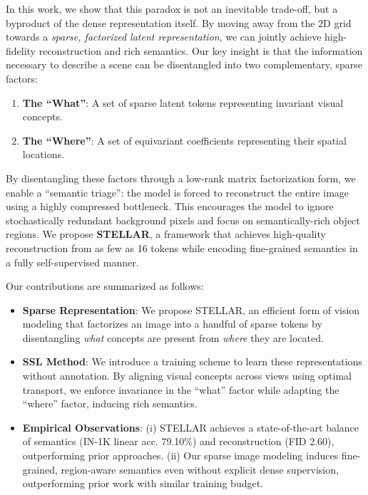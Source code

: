 In this work, we show that this paradox is not an inevitable trade-off, but a byproduct of the dense representation itself. By moving away from the 2D grid towards a \textit{sparse, factorized latent representation}, we can jointly achieve high-fidelity reconstruction and rich semantics. Our key insight is that the information necessary to describe a scene can be disentangled into two complementary, sparse factors:
\begin{enumerate}
    \item \textbf{The ``What''}: A set of sparse latent tokens representing invariant visual concepts.
    \item \textbf{The ``Where''}: A set of equivariant coefficients representing their spatial locations.
\end{enumerate}



By disentangling these factors through a low-rank matrix factorization form, we enable a ``semantic triage'': the model is forced to reconstruct the entire image using a highly compressed bottleneck. This encourages the model to ignore stochastically redundant background pixels and focus on semantically-rich object regions. We propose \textbf{STELLAR}, a framework that achieves high-quality reconstruction from as few as 16 tokens while encoding fine-grained semantics in a fully self-supervised manner.

Our contributions are summarized as follows:
\begin{itemize}
    \item \textbf{Sparse Representation}: We propose STELLAR, an efficient form of vision modeling that factorizes an image into a handful of sparse tokens by disentangling \textit{what} concepts are present from \textit{where} they are located.
    \item \textbf{SSL Method}: We introduce a training scheme to learn these representations without annotation. By aligning visual concepts across views using optimal transport, we enforce invariance in the ``what'' factor while adapting the ``where'' factor, inducing rich semantics.
    \item \textbf{Empirical Observations}: (i) STELLAR achieves a state-of-the-art balance of semantics (IN-1K linear acc. 79.10\%) and reconstruction (FID 2.60), outperforming prior approaches. (ii) Our sparse image modeling induces fine-grained, region-aware semantics even without explicit dense supervision, outperforming prior work with similar training budget.
\end{itemize}

